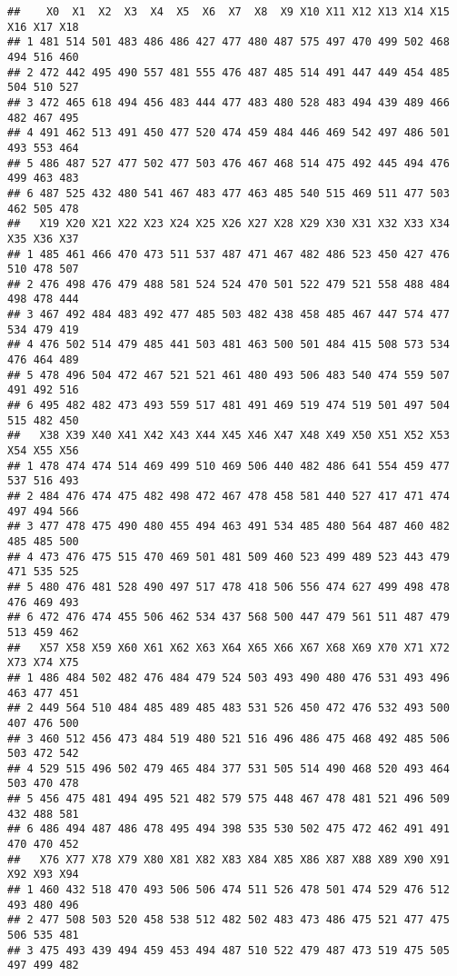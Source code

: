 \documentclass[
]{article}
\begin{document}
\begin{verbatim}
##    X0  X1  X2  X3  X4  X5  X6  X7  X8  X9 X10 X11 X12 X13 X14 X15 X16 X17 X18
## 1 481 514 501 483 486 486 427 477 480 487 575 497 470 499 502 468 494 516 460
## 2 472 442 495 490 557 481 555 476 487 485 514 491 447 449 454 485 504 510 527
## 3 472 465 618 494 456 483 444 477 483 480 528 483 494 439 489 466 482 467 495
## 4 491 462 513 491 450 477 520 474 459 484 446 469 542 497 486 501 493 553 464
## 5 486 487 527 477 502 477 503 476 467 468 514 475 492 445 494 476 499 463 483
## 6 487 525 432 480 541 467 483 477 463 485 540 515 469 511 477 503 462 505 478
##   X19 X20 X21 X22 X23 X24 X25 X26 X27 X28 X29 X30 X31 X32 X33 X34 X35 X36 X37
## 1 485 461 466 470 473 511 537 487 471 467 482 486 523 450 427 476 510 478 507
## 2 476 498 476 479 488 581 524 524 470 501 522 479 521 558 488 484 498 478 444
## 3 467 492 484 483 492 477 485 503 482 438 458 485 467 447 574 477 534 479 419
## 4 476 502 514 479 485 441 503 481 463 500 501 484 415 508 573 534 476 464 489
## 5 478 496 504 472 467 521 521 461 480 493 506 483 540 474 559 507 491 492 516
## 6 495 482 482 473 493 559 517 481 491 469 519 474 519 501 497 504 515 482 450
##   X38 X39 X40 X41 X42 X43 X44 X45 X46 X47 X48 X49 X50 X51 X52 X53 X54 X55 X56
## 1 478 474 474 514 469 499 510 469 506 440 482 486 641 554 459 477 537 516 493
## 2 484 476 474 475 482 498 472 467 478 458 581 440 527 417 471 474 497 494 566
## 3 477 478 475 490 480 455 494 463 491 534 485 480 564 487 460 482 485 485 500
## 4 473 476 475 515 470 469 501 481 509 460 523 499 489 523 443 479 471 535 525
## 5 480 476 481 528 490 497 517 478 418 506 556 474 627 499 498 478 476 469 493
## 6 472 476 474 455 506 462 534 437 568 500 447 479 561 511 487 479 513 459 462
##   X57 X58 X59 X60 X61 X62 X63 X64 X65 X66 X67 X68 X69 X70 X71 X72 X73 X74 X75
## 1 486 484 502 482 476 484 479 524 503 493 490 480 476 531 493 496 463 477 451
## 2 449 564 510 484 485 489 485 483 531 526 450 472 476 532 493 500 407 476 500
## 3 460 512 456 473 484 519 480 521 516 496 486 475 468 492 485 506 503 472 542
## 4 529 515 496 502 479 465 484 377 531 505 514 490 468 520 493 464 503 470 478
## 5 456 475 481 494 495 521 482 579 575 448 467 478 481 521 496 509 432 488 581
## 6 486 494 487 486 478 495 494 398 535 530 502 475 472 462 491 491 470 470 452
##   X76 X77 X78 X79 X80 X81 X82 X83 X84 X85 X86 X87 X88 X89 X90 X91 X92 X93 X94
## 1 460 432 518 470 493 506 506 474 511 526 478 501 474 529 476 512 493 480 496
## 2 477 508 503 520 458 538 512 482 502 483 473 486 475 521 477 475 506 535 481
## 3 475 493 439 494 459 453 494 487 510 522 479 487 473 519 475 505 497 499 482

\end{verbatim}
\end{document}
